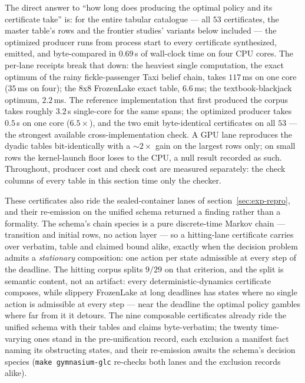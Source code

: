The direct answer to ``how long does producing the optimal policy and
its certificate take'' is: for the entire tabular catalogue --- all
$53$ certificates, the master table's rows and the frontier studies'
variants below included --- the optimized producer runs from process
start to every certificate synthesized, emitted, and byte-compared in
$0.69$\,s of wall-clock time on four CPU cores. The per-lane receipts
break that down: the heaviest single computation, the exact optimum
of the rainy fickle-passenger Taxi belief chain, takes $117$\,ms on
one core ($35$\,ms on four); the 8x8 FrozenLake exact table,
$6.6$\,ms; the textbook-blackjack optimum, $2.2$\,ms. The reference
implementation that first produced the corpus takes roughly
$3.2$\,s single-core for the same spans; the optimized producer
takes $0.5$\,s on one core ($6.5\times$), and the two emit
byte-identical certificates on all $53$ --- the strongest available
cross-implementation check. A GPU lane reproduces
the dyadic tables bit-identically with a $\sim 2\times$ gain on the
largest rows only; on small rows the kernel-launch floor loses to the
CPU, a null result recorded as such. Throughout, producer cost and
check cost are measured separately: the check columns of every table
in this section time only the checker.

These certificates also ride the sealed-container lanes of
section~\ref{sec:exp-repro}, and their re-emission on the unified
schema returned a finding rather than a formality. The schema's
chain species is a pure discrete-time Markov chain --- transition
and initial rows, no action layer --- so a hitting-lane certificate
carries over verbatim, table and claimed bound alike, exactly when
the decision problem admits a \emph{stationary} composition: one
action per state admissible at every step of the deadline. The
hitting corpus splits $9/29$ on that criterion, and the split is
semantic content, not an artifact: every deterministic-dynamics
certificate composes, while slippery FrozenLake at long deadlines
has states where no single action is admissible at every step ---
near the deadline the optimal policy gambles where far from it it
detours. The nine composable certificates already ride the unified
schema with their tables and claims byte-verbatim; the twenty
time-varying ones stand in the pre-unification record, each
exclusion a manifest fact naming its obstructing states, and their
re-emission awaits the schema's decision species
(\texttt{make gymnasium-glc} re-checks both lanes and the exclusion
records alike).

